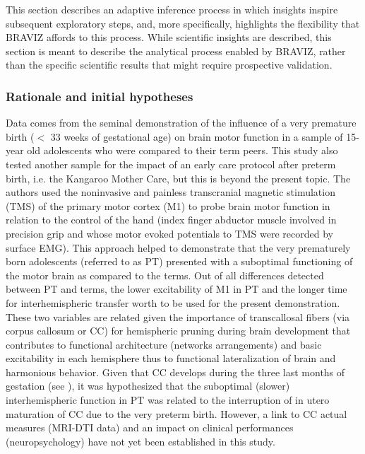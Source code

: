 \documentclass[twocolumn]{svjour3}
\begin{document}
This section describes an adaptive inference process in which insights inspire subsequent exploratory steps, and, more specifically, highlights the flexibility that BRAVIZ affords to this process. While scientific insights are described, this section is meant to describe the analytical process enabled by BRAVIZ, rather than the specific scientific results that might require prospective validation.

\subsubsection{Rationale and initial hypotheses}

Data comes from the seminal demonstration \cite{schneider_cerebral_2012} of the influence of a very premature birth ($<$ 33 weeks of gestational age) on brain motor function in a sample of 15-year old adolescents who were compared to their term peers. This study also tested another sample for the impact of an early care protocol after preterm birth, i.e. the Kangaroo Mother Care, but this is beyond the present topic. The authors used the noninvasive and painless transcranial magnetic stimulation (TMS) of the primary motor cortex (M1) to probe brain motor function in relation to the control of the hand (index finger abductor muscle involved in precision grip and whose motor evoked potentials to TMS were recorded by surface EMG). This approach helped to demonstrate that the very prematurely born adolescents (referred to as PT) presented with a suboptimal functioning of the motor brain as compared to the terms. Out of all differences detected between PT and terms, the lower excitability of M1 in PT and the longer time for interhemispheric transfer worth to be used for the present demonstration. These two variables are related given the importance of transcallosal fibers (via corpus callosum or CC) for hemispheric pruning during brain development that contributes to functional architecture (networks arrangements) and basic excitability in each hemisphere thus to functional lateralization of brain and harmonious behavior. Given that CC develops during the three last months of gestation (see \cite{schneider_cerebral_2012}), it was hypothesized that the suboptimal (slower) interhemispheric function in PT was related to the interruption of in utero maturation of CC due to the very preterm birth. However, a link to CC actual measures (MRI-DTI data) and an impact on clinical performances (neuropsychology) have not yet been established in this study.
\end{document}
